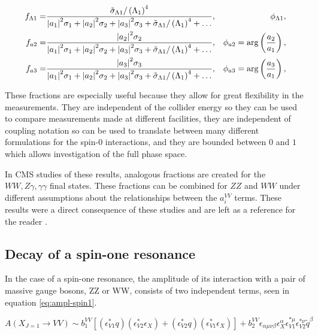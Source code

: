 \begin{eqnarray}
f_{\Lambda1} =& \frac{\tilde{\sigma}_{\Lambda1}/\left(\Lambda_{1}\right)^{4}}{\abs{a_1}^2 \sigma_{1} + \abs{a_2}^2 \sigma_{2} + \abs{a_3}^2 \sigma_{3} + \tilde{\sigma}_{\Lambda{1}}/\left(\Lambda_{1}\right)^{4} +\ldots}, &\phi_{\Lambda1}, \nonumber \\
f_{a2} =& \frac{\abs{a_2}^2 \sigma_{2}}{\abs{a_1}^2 \sigma_{1} + \abs{a_2}^2 \sigma_{2} + \abs{a_3}^2 \sigma_{3} + \tilde{\sigma}_{\Lambda{1}}/\left(\Lambda_{1}\right)^{4} +\ldots}, &\phi_{a2} = \text{arg}\left(\frac{a_{2}}{a_{1}}\right), \\
f_{a3} =& \frac{\abs{a_3}^2 \sigma_{3}}{\abs{a_1}^2 \sigma_{1} + \abs{a_2}^2 \sigma_{2} + \abs{a_3}^2 \sigma_{3} + \tilde{\sigma}_{\Lambda{1}}/\left(\Lambda_{1}\right)^{4} +\ldots}, &\phi_{a3} = \text{arg}\left(\frac{a_{3}}{a_{1}}\right), \nonumber
\label{eq:fa_definitions}
\end{eqnarray}


These fractions are especially useful because they allow for great flexibility in the measurements. They are independent of the collider energy so they can be used to compare measurements made at different facilities, they are independent of coupling notation so can be used to translate between many different formulations for the spin-0 interactions, and they are bounded between $0$ and $1$ which allows investigation of the full phase space. 

In CMS studies of these results, analogous fractions are created for the $WW, Z\gamma, \gamma\gamma$ final states. These fractions can be combined for $ZZ$ and $WW$ under different assumptions about the relationships between the $a_{i}^{VV}$ terms. These results were a direct consequence of these studies and are left as a reference for the reader \cite{Khachatryan:2014kca}. 

\subsection{Decay of a spin-one resonance}
\label{sec:Spin1_Pheno}

In the case of a spin-one resonance, the amplitude of its interaction with a pair of massive gauge bosons, ZZ or WW, consists of two independent terms, seen in equation \eqref{eq:ampl-spin1}.

\begin{equation}
A(X_{J=1} \to VV) \sim b_{1}^{VV}  \left[ \left(\epsilon_{V1}^{*}q\right)\left(\epsilon_{V2}^{*}\epsilon_{X}\right) + \left(\epsilon_{V2}^{*}q\right)\left(\epsilon_{V1}^{*}\epsilon_{X}\right) \right] + b_{2}^{VV}  \epsilon_{\alpha\mu\nu\beta}\epsilon_{X}^{\alpha}\epsilon_{V1}^{*\mu}\epsilon_{V2}^{*\nu}{\tilde q}^{\beta}
\label{eq:ampl-spin1}
\end{equation}


